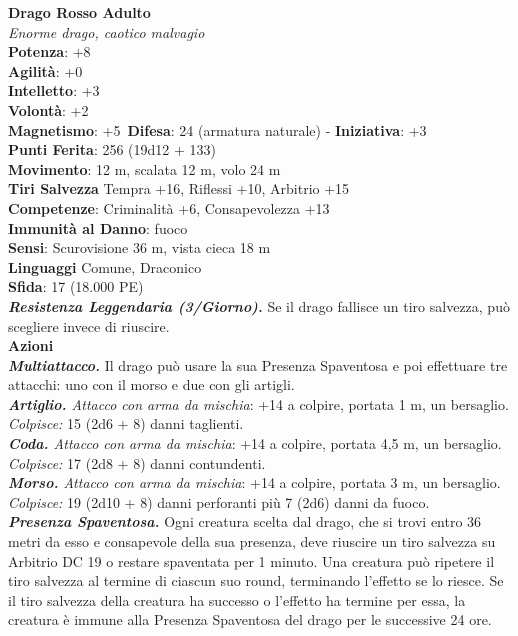 \begin{multicols}{2}
\medskip\textbf{Drago Rosso Adulto}\\
\emph{Enorme drago, caotico malvagio}\\
\textbf{Potenza}: +8\\
\textbf{Agilità}: +0\\
\textbf{Intelletto}: +3\\
\textbf{Volontà}: +2\\
\textbf{Magnetismo}: +5\
\textbf{Difesa}: 24 (armatura naturale) - \textbf{Iniziativa}: +3\\
\textbf{Punti Ferita}: 256 (19d12 + 133)\\
\textbf{Movimento}: 12 m, scalata 12 m, volo 24 m\\
\textbf{Tiri Salvezza} Tempra +16, Riflessi +10, Arbitrio +15\\
\textbf{Competenze}: Criminalità +6, Consapevolezza +13\\
\textbf{Immunità al Danno}: fuoco\\
\textbf{Sensi}: Scurovisione 36 m, vista cieca 18 m\\
\textbf{Linguaggi} Comune, Draconico\\
\textbf{Sfida}: 17 (18.000 PE)\smallskip\\
\emph{\textbf{Resistenza Leggendaria (3/Giorno).}} Se il drago fallisce un tiro salvezza, può scegliere invece di riuscire.\\
\smallskip\textbf{Azioni}\\
\emph{\textbf{Multiattacco.}} Il drago può usare la sua Presenza Spaventosa e poi effettuare tre attacchi: uno con il morso e due con gli artigli.\\
\emph{\textbf{Artiglio.} Attacco con arma da mischia}: +14 a colpire, portata 1 m, un bersaglio.\\
\emph{Colpisce:} 15 (2d6 + 8) danni taglienti.\\
\emph{\textbf{Coda.} Attacco con arma da mischia}: +14 a colpire, portata 4,5 m, un bersaglio.\\
\emph{Colpisce:} 17 (2d8 + 8) danni contundenti.\\
\emph{\textbf{Morso.} Attacco con arma da mischia}: +14 a colpire, portata 3 m, un bersaglio.\\
\emph{Colpisce:} 19 (2d10 + 8) danni perforanti più 7 (2d6) danni da fuoco.\\
\emph{\textbf{Presenza Spaventosa.}} Ogni creatura scelta dal drago, che si trovi entro 36 metri da esso e consapevole della sua presenza, deve riuscire un tiro salvezza su Arbitrio DC 19 o restare spaventata per 1 minuto. Una creatura può ripetere il tiro salvezza al termine di ciascun suo round, terminando l'effetto se lo riesce. Se il tiro salvezza della creatura ha successo o l'effetto ha termine per essa, la creatura è immune alla Presenza Spaventosa del drago per le successive 24 ore.\\

\end{multicols}
